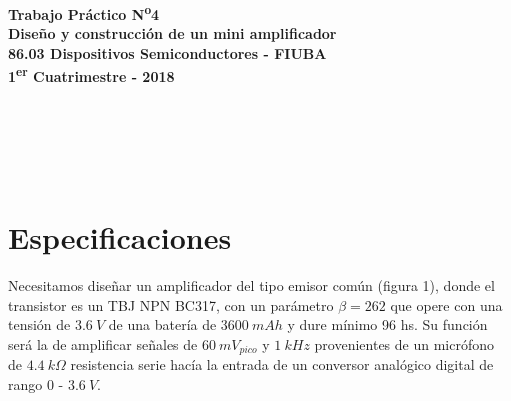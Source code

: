 \documentclass[a4paper, 10pt, spanish]{article}
\numberwithin{equation}{section}
\numberwithin{table}{section}
\begin{document}
\marginsize{2cm}{2cm}{2cm}{2cm}

%
%
\setcounter{page}{1}

%
%


%
%
\thispagestyle{empty}

\begin{center}
{\LARGE{\bfseries Trabajo Práctico N\textsuperscript{o}4}}\\
{\LARGE{\bfseries Diseño y construcción de un mini amplificador}}\\
{\large{\bfseries 86.03 Dispositivos Semiconductores - FIUBA}}\\
{\large{\bfseries 1\textsuperscript{er} Cuatrimestre - 2018}}
\end{center}

\hspace

\begin{center}
{\large{}}\\
{\large{}}\\
{\large{}}\\
{\large{}}\\
\end{center}



\section{Especificaciones}
Necesitamos diseñar un amplificador del tipo emisor común (figura 1), donde el transistor es un TBJ NPN BC317, con un parámetro $\beta = 262$ que opere con una tensión de $3.6\ V$ de una batería de $3600\ mAh$ y dure mínimo 96 hs. Su función será la de amplificar señales de $60\ mV_{pico}$ y $1\ kHz$ provenientes de un micrófono de $4.4\ k\Omega$ resistencia serie hacía la entrada de un conversor analógico digital de rango 0 - $3.6\ V$.
\end{document}
